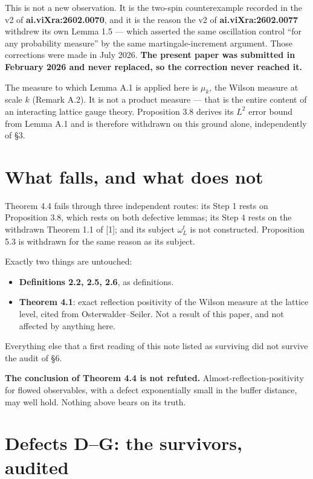 \documentclass[11pt]{article}
\begin{document}
This is not a new observation. It is the two-spin counterexample recorded in the v2 of
\textbf{ai.viXra:2602.0070}, and it is the reason the v2 of
\textbf{ai.viXra:2602.0077} withdrew its own Lemma 1.5 --- which asserted the same
oscillation control ``for any probability measure'' by the same martingale-increment
argument. Those corrections were made in July 2026. \textbf{The present paper was
submitted in February 2026 and never replaced, so the correction never reached it.}

The measure to which Lemma A.1 is applied here is $\mu_k$, the Wilson measure at scale
$k$ (Remark A.2). It is not a product measure --- that is the entire content of an
interacting lattice gauge theory. Proposition 3.8 derives its $L^2$ error bound from
Lemma A.1 and is therefore withdrawn on this ground alone, independently of \S3.

\section{What falls, and what does not}

Theorem 4.4 fails through three independent routes: its Step 1 rests on Proposition
3.8, which rests on both defective lemmas; its Step 4 rests on the withdrawn Theorem
1.1 of [1]; and its subject $\omega^t_L$ is not constructed. Proposition 5.3 is
withdrawn for the same reason as its subject.

Exactly two things are untouched:
\begin{itemize}
\item \textbf{Definitions 2.2, 2.5, 2.6}, as definitions.
\item \textbf{Theorem 4.1}: exact reflection positivity of the Wilson measure at the
lattice level, cited from Osterwalder--Seiler. Not a result of this paper, and not
affected by anything here.
\end{itemize}

\noindent
Everything else that a first reading of this note listed as surviving did not survive
the audit of \S6.

\noindent
\textbf{The conclusion of Theorem 4.4 is not refuted.} Almost-reflection-positivity
for flowed observables, with a defect exponentially small in the buffer distance, may
well hold. Nothing above bears on its truth.

\section{Defects D--G: the survivors, audited}
\end{document}
